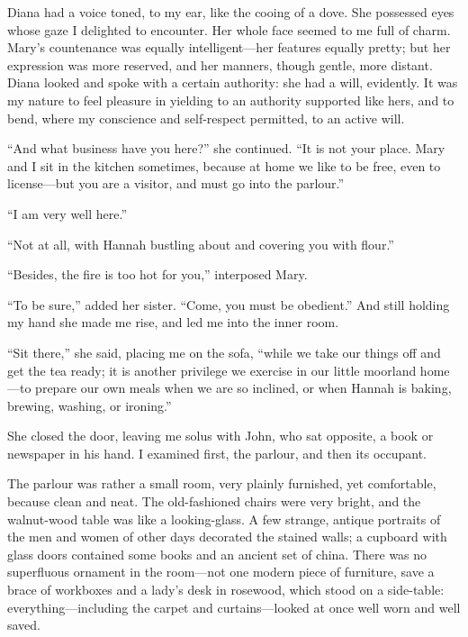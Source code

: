 Diana had a voice toned, to my ear, like the cooing of a dove. She
possessed eyes whose gaze I delighted to encounter. Her whole face
seemed to me full of charm. Mary's countenance was equally
intelligent---her features equally pretty; but her expression was more
reserved, and her manners, though gentle, more distant. Diana looked
and spoke with a certain authority: she had a will, evidently. It was
my nature to feel pleasure in yielding to an authority supported like
hers, and to bend, where my conscience and self-respect permitted, to an
active will.

\enquote{And what business have you here?} she continued. \enquote{It
	is not your place. Mary and I sit in the kitchen sometimes, because at
	home we like to be free, even to license---but you are a visitor, and
	must go into the parlour.}

\enquote{I am very well here.}

\enquote{Not at all, with Hannah bustling about and covering you with
	flour.}

\enquote{Besides, the fire is too hot for you,} interposed Mary.

\enquote{To be sure,} added her sister. \enquote{Come, you must be
	obedient.} And still holding my hand she made me rise, and led me into
the inner room.

\enquote{Sit there,} she said, placing me on the sofa, \enquote{while we
	take our things off and get the tea ready; it is another privilege we
	exercise in our little moorland home---to prepare our own meals when we
	are so inclined, or when Hannah is baking, brewing, washing, or
	ironing.}

She closed the door, leaving me solus with \Mr{} \St{} John, who sat
opposite, a book or newspaper in his hand. I examined first, the
parlour, and then its occupant.

The parlour was rather a small room, very plainly furnished, yet
comfortable, because clean and neat. The old-fashioned chairs were very
bright, and the walnut-wood table was like a looking-glass. A few
strange, antique portraits of the men and women of other days decorated
the stained walls; a cupboard with glass doors contained some books and
an ancient set of china. There was no superfluous ornament in the
room---not one modern piece of furniture, save a brace of workboxes and
a lady's desk in rosewood, which stood on a side-table:
everything---including the carpet and curtains---looked at once well
worn and well saved.

